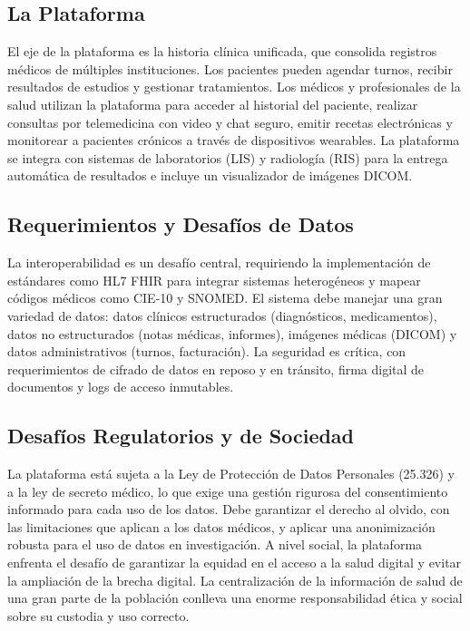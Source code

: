 \documentclass[12pt]{article}
\begin{document}
\subsection{La Plataforma}
El eje de la plataforma es la historia clínica unificada, que consolida registros médicos de múltiples instituciones. Los pacientes pueden agendar turnos, recibir resultados de estudios y gestionar tratamientos. Los médicos y profesionales de la salud utilizan la plataforma para acceder al historial del paciente, realizar consultas por telemedicina con video y chat seguro, emitir recetas electrónicas y monitorear a pacientes crónicos a través de dispositivos wearables. La plataforma se integra con sistemas de laboratorios (LIS) y radiología (RIS) para la entrega automática de resultados e incluye un visualizador de imágenes DICOM.

\subsection{Requerimientos y Desafíos de Datos}
La interoperabilidad es un desafío central, requiriendo la implementación de estándares como HL7 FHIR para integrar sistemas heterogéneos y mapear códigos médicos como CIE-10 y SNOMED. El sistema debe manejar una gran variedad de datos: datos clínicos estructurados (diagnósticos, medicamentos), datos no estructurados (notas médicas, informes), imágenes médicas (DICOM) y datos administrativos (turnos, facturación). La seguridad es crítica, con requerimientos de cifrado de datos en reposo y en tránsito, firma digital de documentos y logs de acceso inmutables.

\subsection{Desafíos Regulatorios y de Sociedad}
La plataforma está sujeta a la Ley de Protección de Datos Personales (25.326) y a la ley de secreto médico, lo que exige una gestión rigurosa del consentimiento informado para cada uso de los datos. Debe garantizar el derecho al olvido, con las limitaciones que aplican a los datos médicos, y aplicar una anonimización robusta para el uso de datos en investigación. A nivel social, la plataforma enfrenta el desafío de garantizar la equidad en el acceso a la salud digital y evitar la ampliación de la brecha digital. La centralización de la información de salud de una gran parte de la población conlleva una enorme responsabilidad ética y social sobre su custodia y uso correcto.
\end{document}
